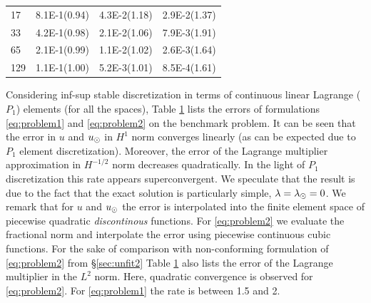 \documentclass[r]{siamart171218}
\begin{document}
\begin{table}
{\begin{center}
\begin{tabular}{l|llll}
17  & 8.1E-1(0.94) & 4.3E-2(1.18) & \multicolumn{2}{c}{2.9E-2(1.37)}\\
33  & 4.2E-1(0.98) & 2.1E-2(1.06) & \multicolumn{2}{c}{7.9E-3(1.91)}\\
65  & 2.1E-1(0.99) & 1.1E-2(1.02) & \multicolumn{2}{c}{2.6E-3(1.64)}\\
129 & 1.1E-1(1.00) & 5.2E-3(1.01) & \multicolumn{2}{c}{8.5E-4(1.61)}\\
\hline
    \end{tabular}
  \end{center}    
  }
  \label{tab:error_conform}
\end{table}

Considering inf-sup stable discretization in terms of continuous linear Lagrange
($P_1$) elements (for all the spaces), Table \ref{tab:error_conform}
lists the errors of formulations \eqref{eq:problem1} and \eqref{eq:problem2}
on the benchmark problem. It can be seen that the error in $u$ and $u_{\odot}$ in $H^1$ norm
converges linearly (as can be expected due to $P_1$ element discretization).
Moreover, the error of the Lagrange multiplier approximation in $H^{-1/2}$ norm
decreases quadratically. In the light of $P_1$ discretization this rate appears
superconvergent. We speculate that the result is due to the fact that the
exact solution is particularly simple, $\lambda=\lambda_{\odot}=0$.
We remark that for $u$ and $u_{\odot}$ the error is interpolated into the finite element space of
piecewise quadratic \emph{discontinous} functions. For \eqref{eq:problem2} we
evaluate the fractional norm and interpolate the error using piecewise continuous
cubic functions. 
For the sake of comparison with non-conforming formulation of \eqref{eq:problem2} from
\S\ref{sec:unfit2} Table \ref{tab:error_conform} also
lists the error of the Lagrange multiplier in the $L^2$ norm. Here, quadratic convergence is observed
for \eqref{eq:problem2}. For \eqref{eq:problem1} the rate is between 1.5 and 2.
\end{document}
